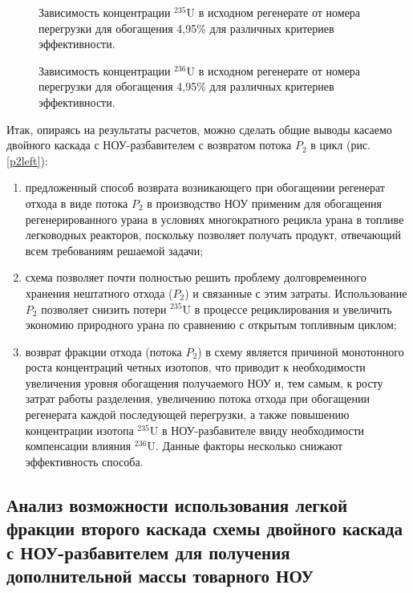 {\begin{figure}[ht]
    \centering
    \begin{minipage}{.5\textwidth}
      \centering
      
      \caption{{Зависимость концентрации $^{235}$U в исходном регенерате от номера перегрузки для обогащения 4,95\% для различных критериев эффективности.{\label{10}}}}
    \end{minipage}%
    \begin{minipage}{.5\textwidth}
      \centering
      
\caption{{Зависимость концентрации $^{236}$U в исходном регенерате от номера перегрузки для обогащения 4,95\% для различных критериев эффективности.{\label{11}}}}
\end{minipage}
\end{figure}


Итак, опираясь на результаты расчетов, можно сделать общие выводы касаемо двойного каскада с НОУ-разбавителем с возвратом потока $P_2$ в цикл (рис. \ref{p2left}):

\begin{enumerate}
    \item предложенный способ возврата возникающего при обогащении регенерат отхода в виде потока $P_2$ в производство НОУ применим для обогащения регенерированного урана в условиях многократного рецикла урана в топливе легководных реакторов, поскольку позволяет получать продукт, отвечающий всем требованиям решаемой задачи;
    \item схема позволяет почти полностью решить проблему долговременного хранения нештатного отхода ($P_2$) и связанные с этим затраты. Использование $P_2$ позволяет снизить потери $^{235}$U в процессе рециклирования и увеличить экономию природного урана по сравнению с открытым топливным циклом;
     \item возврат фракции отхода (потока $P_2$) в схему является причиной монотонного роста концентраций четных изотопов, что приводит к необходимости увеличения уровня обогащения получаемого НОУ и, тем самым, к росту затрат работы разделения, увеличению потока отхода при обогащении регенерата каждой последующей перегрузки, а также повышению концентрации изотопа $^{235}$U в НОУ-разбавителе ввиду необходимости компенсации влияния $^{236}$U. Данные факторы несколько снижают эффективность способа.
\end{enumerate}


\subsection{Анализ возможности использования легкой фракции второго каскада схемы двойного каскада с НОУ-разбавителем для получения дополнительной массы товарного НОУ}\label{indep_p2}

}
